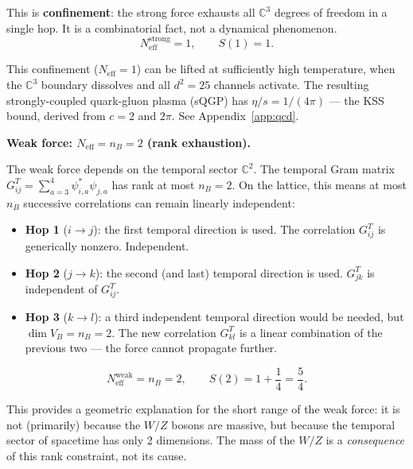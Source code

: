 This is \textbf{confinement}: the strong force exhausts all $\mathbb{C}^3$ degrees of freedom in a single hop. It is a combinatorial fact, not a dynamical phenomenon.
\begin{equation}
N_\text{eff}^\text{strong} = 1, \qquad S(1) = 1.
\end{equation}

\begin{remark}
This confinement ($N_\text{eff} = 1$) can be lifted at sufficiently high temperature, when the $\mathbb{C}^3$ boundary dissolves and all $d^2 = 25$ channels activate. The resulting strongly-coupled quark-gluon plasma (sQGP) has $\eta/s = 1/(4\pi)$ --- the KSS bound, derived from $c = 2$ and $2\pi$. See Appendix~\ref{app:qcd}.
\end{remark}

\bigskip

\noindent\textbf{Weak force: $N_\text{eff} = n_B = 2$ (rank exhaustion).}

The weak force depends on the temporal sector $\mathbb{C}^2$. The temporal Gram matrix $G^T_{ij} = \sum_{a=3}^{4}\psi^*_{i,a}\psi_{j,a}$ has rank at most $n_B = 2$. On the lattice, this means at most $n_B$ successive correlations can remain linearly independent:

\begin{itemize}
\item \textbf{Hop 1} ($i \to j$): the first temporal direction is used. The correlation $G^T_{ij}$ is generically nonzero. Independent.
\item \textbf{Hop 2} ($j \to k$): the second (and last) temporal direction is used. $G^T_{jk}$ is independent of $G^T_{ij}$.
\item \textbf{Hop 3} ($k \to l$): a third independent temporal direction would be needed, but $\dim V_B = n_B = 2$. The new correlation $G^T_{kl}$ is a linear combination of the previous two --- the force cannot propagate further.
\end{itemize}

\begin{equation}
N_\text{eff}^\text{weak} = n_B = 2, \qquad S(2) = 1 + \frac{1}{4} = \frac{5}{4}.
\end{equation}

\begin{remark}
This provides a geometric explanation for the short range of the weak force: it is not (primarily) because the $W/Z$ bosons are massive, but because the temporal sector of spacetime has only 2 dimensions. The mass of the $W/Z$ is a \emph{consequence} of this rank constraint, not its cause.
\end{remark}

